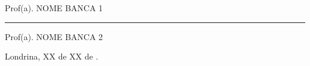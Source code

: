 \documentclass{abntex2}
\begin{document}
{\begin{center}
\begin{folhadeaprovacao}
\begin{center}
\begin{flushright}
\begin{minipage}{10cm}
						Prof(a). NOME BANCA 1
						
						\imprimirinstituicao
					\end{minipage}%
				\end{flushright}		
				
				
				\vspace{1cm}
				
				\begin{flushright}
					\begin{minipage}{10cm}	
						\centering
						\hrule \hspace{0.2cm}
						
						Prof(a). NOME BANCA 2 
						
						\imprimirinstituicao
					\end{minipage}%
				\end{flushright}
				
				\vfill 
				
				\begin{flushright}
					\begin{minipage}{6cm}	
				\centering
				Londrina, XX de XX de \imprimirdata.
					\end{minipage}
			\end{flushright}
		
			\end{center} 
		\end{folhadeaprovacao}
	\end{center}
}
\makeatother




\end{document}

